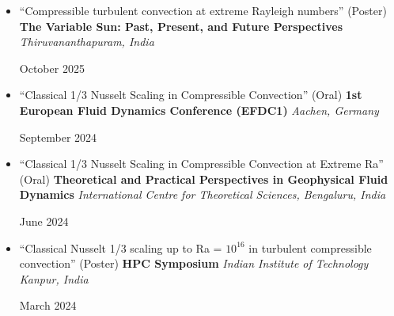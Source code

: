 \documentclass[10pt,a4paper]{article}
\begin{document}
\begin{itemize}[leftmargin=1.5em, itemsep=6pt, parsep=0pt]
  \item \begin{minipage}[t]{0.80\linewidth}
          ``Compressible turbulent convection at extreme Rayleigh numbers'' (Poster) \newline
          \textbf{The Variable Sun: Past, Present, and Future Perspectives} \newline
          \textit{Thiruvananthapuram, India}
        \end{minipage}%
        \begin{minipage}[t]{0.20\linewidth}
          \raggedleft
          October 2025
        \end{minipage}

  \item \begin{minipage}[t]{0.80\linewidth}
          ``Classical 1/3 Nusselt Scaling in Compressible Convection'' (Oral) \newline
          \textbf{1st European Fluid Dynamics Conference (EFDC1)} \newline
          \textit{Aachen, Germany}
        \end{minipage}%
        \begin{minipage}[t]{0.20\linewidth}
          \raggedleft
          September 2024
        \end{minipage}

  \item \begin{minipage}[t]{0.80\linewidth}
          ``Classical 1/3 Nusselt Scaling in Compressible Convection at Extreme Ra'' (Oral) \newline
          \textbf{Theoretical and Practical Perspectives in Geophysical Fluid Dynamics} \newline
          \textit{International Centre for Theoretical Sciences, Bengaluru, India}
        \end{minipage}%
        \begin{minipage}[t]{0.20\linewidth}
          \raggedleft
          June 2024
        \end{minipage}

  \item \begin{minipage}[t]{0.80\linewidth}
          ``Classical Nusselt 1/3 scaling up to Ra = $10^{16}$ in turbulent compressible convection'' (Poster) \newline
          \textbf{HPC Symposium} \newline
          \textit{Indian Institute of Technology Kanpur, India}
        \end{minipage}%
        \begin{minipage}[t]{0.20\linewidth}
          \raggedleft
          March 2024
        \end{minipage}


\end{itemize}
\end{document}
